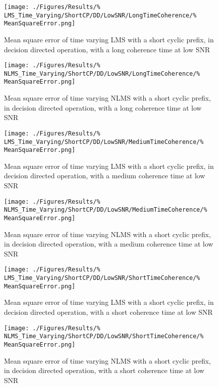 \begin{figure}[ht]
	\centering
	\begin{minipage}{0.49\textwidth}
		\centering
		\texttt{[image: ./Figures/Results/\%
	LMS\_Time\_Varying/ShortCP/DD/LowSNR/LongTimeCoherence/\%
	MeanSquareError.png]}
		\captionsetup{width=0.75\linewidth}
		\caption{Mean square error of time varying LMS with a 
		short cyclic prefix, in decision directed operation, 
		with a long coherence time at low SNR}
	\end{minipage}
	\begin{minipage}{0.49\textwidth}
		\centering
		\texttt{[image: ./Figures/Results/\%
	NLMS\_Time\_Varying/ShortCP/DD/LowSNR/LongTimeCoherence/\%
	MeanSquareError.png]}
		\captionsetup{width=0.75\linewidth}
		\caption{Mean square error of time varying NLMS with 
		a short cyclic prefix, in decision directed 
		operation, with a long coherence time at low SNR}
	\end{minipage}
\end{figure}

\begin{figure}[ht]
	\centering
	\begin{minipage}{0.49\textwidth}
		\centering
		\texttt{[image: ./Figures/Results/\%
	LMS\_Time\_Varying/ShortCP/DD/LowSNR/MediumTimeCoherence/\%
	MeanSquareError.png]}
		\captionsetup{width=0.75\linewidth}
		\caption{Mean square error of time varying LMS with a 
		short cyclic prefix, in decision directed operation, 
		with a medium coherence time at low SNR}
	\end{minipage}
	\begin{minipage}{0.49\textwidth}
		\centering
		\texttt{[image: ./Figures/Results/\%
	NLMS\_Time\_Varying/ShortCP/DD/LowSNR/MediumTimeCoherence/\%
	MeanSquareError.png]}
		\captionsetup{width=0.75\linewidth}
		\caption{Mean square error of time varying NLMS with 
		a short cyclic prefix, in decision directed 
		operation, with a medium coherence time at low SNR}
	\end{minipage}
\end{figure}

\begin{figure}[ht]
	\centering
	\begin{minipage}{0.49\textwidth}
		\centering
		\texttt{[image: ./Figures/Results/\%
	LMS\_Time\_Varying/ShortCP/DD/LowSNR/ShortTimeCoherence/\%
	MeanSquareError.png]}
		\captionsetup{width=0.75\linewidth}
		\caption{Mean square error of time varying LMS with a 
		short cyclic prefix, in decision directed operation, 
		with a short coherence time at low SNR}
	\end{minipage}
	\begin{minipage}{0.49\textwidth}
		\centering
		\texttt{[image: ./Figures/Results/\%
	NLMS\_Time\_Varying/ShortCP/DD/LowSNR/ShortTimeCoherence/\%
	MeanSquareError.png]}
		\captionsetup{width=0.75\linewidth}
		\caption{Mean square error of time varying NLMS with 
		a short cyclic prefix, in decision directed 
		operation, with a short coherence time at low SNR}
	\end{minipage}
\end{figure}

